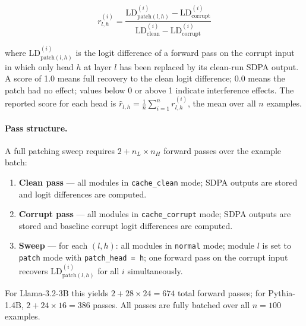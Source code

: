 \documentclass[11pt,a4paper]{article}
\begin{document}
\begin{equation}
  r_{l,h}^{(i)} = \frac{
    \text{LD}^{(i)}_{\text{patch}(l,h)} - \text{LD}^{(i)}_{\text{corrupt}}
  }{
    \text{LD}^{(i)}_{\text{clean}} - \text{LD}^{(i)}_{\text{corrupt}}
  }
  \label{eq:recovery}
\end{equation}

where $\text{LD}^{(i)}_{\text{patch}(l,h)}$ is the logit difference of a forward pass
on the corrupt input in which only head $h$ at layer $l$ has been replaced by its
clean-run SDPA output. A score of 1.0 means full recovery to the clean logit
difference; 0.0 means the patch had no effect; values below 0 or above 1 indicate
interference effects. The reported score for each head is
$\hat{r}_{l,h} = \frac{1}{n}\sum_{i=1}^n r_{l,h}^{(i)}$, the mean over all $n$
examples.

\paragraph{Pass structure.}
A full patching sweep requires $2 + n_L \times n_H$ forward passes over the example
batch:

\begin{enumerate}
  \item \textbf{Clean pass} --- all modules in \texttt{cache\_clean} mode; SDPA
    outputs are stored and logit differences are computed.
  \item \textbf{Corrupt pass} --- all modules in \texttt{cache\_corrupt} mode; SDPA
    outputs are stored and baseline corrupt logit differences are computed.
  \item \textbf{Sweep} --- for each $(l, h)$: all modules in \texttt{normal} mode;
    module $l$ is set to \texttt{patch} mode with \texttt{patch\_head = h}; one
    forward pass on the corrupt input recovers
    $\text{LD}^{(i)}_{\text{patch}(l,h)}$ for all $i$ simultaneously.
\end{enumerate}

For Llama-3.2-3B this yields $2 + 28 \times 24 = 674$ total forward passes; for
Pythia-1.4B, $2 + 24 \times 16 = 386$ passes. All passes are fully batched over all
$n = 100$ examples.
\end{document}
